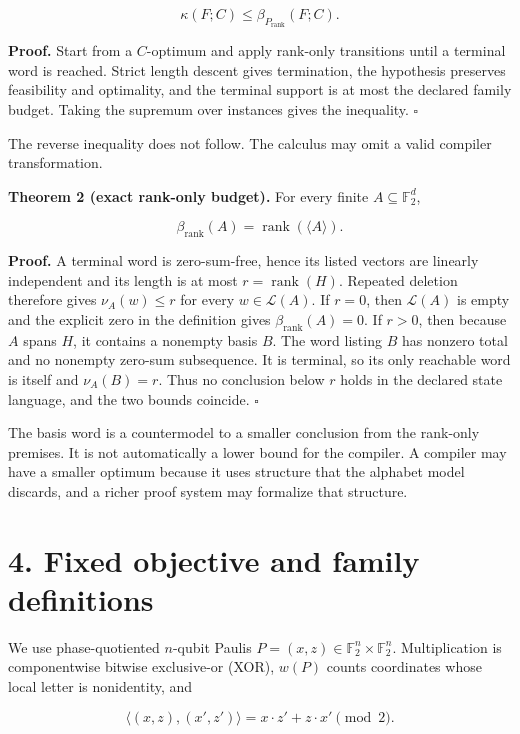 \documentclass[11pt]{article}
\begin{document}
\[
\kappa(F;C)\leq\beta_{P_{\mathrm{rank}}}(F;C).
\]

\textbf{Proof.} Start from a \(C\)-optimum and apply rank-only transitions until a terminal word is reached. Strict length descent gives termination, the hypothesis preserves feasibility and optimality, and the terminal support is at most the declared family budget. Taking the supremum over instances gives the inequality. \(\square\)

The reverse inequality does not follow. The calculus may omit a valid compiler transformation.

\textbf{Theorem 2 (exact rank-only budget).} For every finite \(A\subseteq\mathbb{F}_2^d\),

\[
\beta_{\mathrm{rank}}(A)=\operatorname{rank}(\langle A\rangle).
\]

\textbf{Proof.} A terminal word is zero-sum-free, hence its listed vectors are linearly independent and its length is at most \(r=\operatorname{rank}(H)\). Repeated deletion therefore gives \(\nu_A(w)\leq r\) for every \(w\in\mathcal{L}(A)\). If \(r=0\), then \(\mathcal{L}(A)\) is empty and the explicit zero in the definition gives \(\beta_{\mathrm{rank}}(A)=0\). If \(r>0\), then because \(A\) spans \(H\), it contains a nonempty basis \(B\). The word listing \(B\) has nonzero total and no nonempty zero-sum subsequence. It is terminal, so its only reachable word is itself and \(\nu_A(B)=r\). Thus no conclusion below \(r\) holds in the declared state language, and the two bounds coincide. \(\square\)

The basis word is a countermodel to a smaller conclusion from the rank-only premises. It is not automatically a lower bound for the compiler. A compiler may have a smaller optimum because it uses structure that the alphabet model discards, and a richer proof system may formalize that structure.

\hypertarget{fixed-objective-and-family-definitions}{%
\section*{4. Fixed objective and family definitions}\label{fixed-objective-and-family-definitions}}

We use phase-quotiented \(n\)-qubit Paulis \(P=(x,z)\in\mathbb{F}_2^n\times\mathbb{F}_2^n\). Multiplication is componentwise bitwise exclusive-or (XOR), \(w(P)\) counts coordinates whose local letter is nonidentity, and

\[
\langle (x,z),(x',z')\rangle=x\cdot z'+z\cdot x'\pmod 2.
\]
\end{document}
